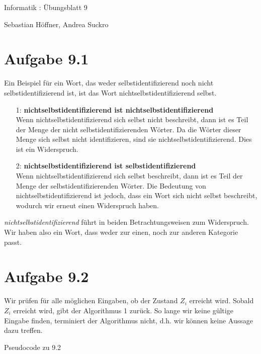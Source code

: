 \documentclass{article}
\begin{document}
\begin{center}
  \Large{Informatik \revD: Übungsblatt 9}

  \large{Sebastian Höffner, Andrea Suckro}
\end{center}



\section*{Aufgabe 9.1}
Ein Beispiel für ein Wort, das weder selbstidentifizierend noch nicht selbstidentifizierend ist, ist das Wort nichtselbstidentifizierend selbst.
\begin{itemize}
  \item[1:] \textbf{nichtselbstidentifizierend ist nichtselbstidentifizierend} \\
    Wenn nichtselbstidentifizierend sich selbst nicht beschreibt, dann ist es Teil der Menge der nicht selbstidentifizierenden Wörter. Da die Wörter dieser Menge sich selbst nicht identifizieren, sind sie nichtselbstidentifizierend. Dies ist ein Widerspruch.
  \item[2:] \textbf{nichtselbstidentifizierend ist selbstidentifizierend} \\
    Wenn nichtselbstidentifizierend sich selbst beschreibt, dann ist es Teil der Menge der selbstidentifizierenden Wörter. Die Bedeutung von nichtselbstidentifizierend ist jedoch, dass ein Wort sich nicht selbst beschreibt, wodurch wir erneut einen Widerspruch haben.
\end{itemize}

\bigskip
\textit{nichtselbstidentifizierend} führt in beiden Betrachtungsweisen zum Widerspruch. Wir haben also ein Wort, dass weder zur einen, noch zur anderen Kategorie passt.



\section*{Aufgabe 9.2}
Wir prüfen für alle möglichen Eingaben, ob der Zustand $Z_i$ erreicht wird. Sobald $Z_i$ erreicht wird, gibt der Algorithmus 1 zurück. So lange wir keine gültige Eingabe finden, terminiert der Algorithmus nicht, d.h. wir können keine Aussage dazu treffen.

\begin{algorithm}[ht]
  \;
  \caption{Pseudocode zu 9.2}
\end{algorithm}
\end{document}
